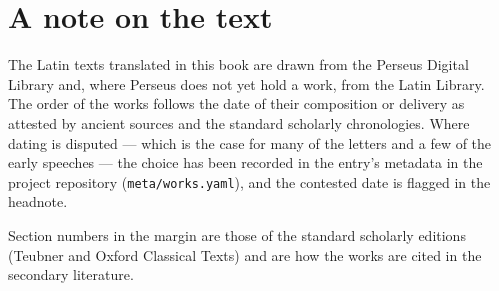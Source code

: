 
\chapter*{A note on the text}

\noindent
The Latin texts translated in this book are drawn from the Perseus Digital
Library and, where Perseus does not yet hold a work, from the Latin Library.
The order of the works follows the date of their composition or delivery as
attested by ancient sources and the standard scholarly chronologies. Where
dating is disputed --- which is the case for many of the letters and a few
of the early speeches --- the choice has been recorded in the entry's
metadata in the project repository (\texttt{meta/works.yaml}), and the
contested date is flagged in the headnote.

Section numbers in the margin are those of the standard scholarly editions
(Teubner and Oxford Classical Texts) and are how the works are cited in the
secondary literature.

%
